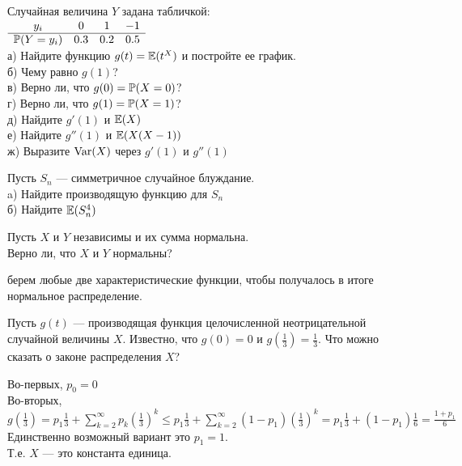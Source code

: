 \begin{problem}
Случайная величина $Y$ задана табличкой: \\
$\begin{array}{cccc}
  y_{i} & 0 & 1 & -1 \\
  \hline
  \P(Y=y_{i}) & 0.3 & 0.2 & 0.5 \\
\end{array}$ \\
а) Найдите функцию $g(t)=\E(t^{X})$ и постройте ее график. \\
б) Чему равно $g(1)$? \\
в) Верно ли, что $g(0)=\P(X=0)$? \\
г) Верно ли, что $g(1)=\P(X=1)$? \\
д) Найдите $g'(1)$ и $\E(X)$ \\
е) Найдите $g''(1)$ и $\E(X(X-1))$ \\
ж) Выразите $\Var(X)$ через $g'(1)$ и $g''(1)$ 
\end{problem} 
\begin{solution} 

\end{solution}

\begin{problem}
Пусть $S_{n}$ --- симметричное случайное блуждание. \\
a) Найдите производящую функцию для $S_{n}$ \\
б) Найдите $\E(S_{n}^{4})$ 
\end{problem} 
\begin{solution} 

\end{solution}

\begin{problem}
Пусть $X$ и $Y$ независимы и их сумма нормальна. \\
Верно ли, что $X$ и $Y$ нормальны? 
\end{problem} 
\begin{solution} 
 берем любые две характеристические функции, чтобы получалось в итоге нормальное распределение. 
\end{solution}

\begin{problem}
Пусть $g(t)$ --- производящая функция целочисленной неотрицательной случайной величины $X$. Известно, что $g(0)=0$ и $g(\frac{1}{3})=\frac{1}{3}$. Что можно сказать о законе распределения $X$? 
\end{problem} 
\begin{solution} 

Во-первых, $p_{0}=0$ \\
Во-вторых, $g(\frac{1}{3})=p_{1}\frac{1}{3}+\sum_{k=2}^{\infty}p_{k}\left(\frac{1}{3}\right)^{k}\le p_{1}\frac{1}{3}+\sum_{k=2}^{\infty}(1-p_{1})\left(\frac{1}{3}\right)^{k}=p_{1}\frac{1}{3}+(1-p_{1})\frac{1}{6}=\frac{1+p_{1}}{6}$ \\
Единственно возможный вариант это $p_{1}=1$. \\
Т.е. $X$ --- это константа единица. 
\end{solution}

